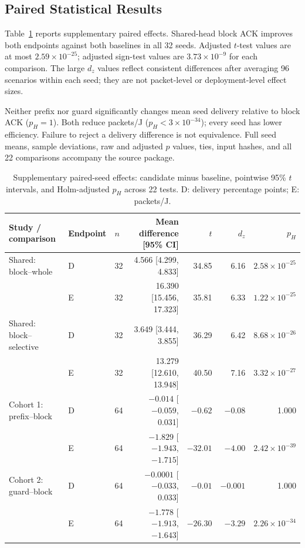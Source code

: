 \documentclass[journal,10pt]{IEEEtran}
\begin{document}
\subsection{Paired Statistical Results}
Table~\ref{tab:paired} reports supplementary paired effects. Shared-head block ACK improves both endpoints against both baselines in all 32 seeds. Adjusted $t$-test values are at most $2.59\times10^{-25}$; adjusted sign-test values are $3.73\times10^{-9}$ for each comparison. The large $d_z$ values reflect consistent differences after averaging 96 scenarios within each seed; they are not packet-level or deployment-level effect sizes.

Neither prefix nor guard significantly changes mean seed delivery relative to block ACK ($p_H=1$). Both reduce packets/J ($p_H<3\times10^{-34}$); every seed has lower efficiency. Failure to reject a delivery difference is not equivalence. Full seed means, sample deviations, raw and adjusted $p$ values, ties, input hashes, and all 22 comparisons accompany the source package.

\begin{table}[t]
\caption{Supplementary paired-seed effects: candidate minus baseline, pointwise 95\% $t$ intervals, and Holm-adjusted $p_H$ across 22 tests. D: delivery percentage points; E: packets/J.}
\label{tab:paired}\centering\small
\begin{tabular}{lllrrrr}\toprule
Study / comparison & Endpoint & $n$ & Mean difference [95\% CI] & $t$ & $d_z$ & $p_H$\\\midrule
Shared: block--whole & D & 32 & 4.566 [4.299, 4.833] & 34.85 & 6.16 & $2.58\times10^{-25}$\\
 & E & 32 & 16.390 [15.456, 17.323] & 35.81 & 6.33 & $1.22\times10^{-25}$\\
Shared: block--selective & D & 32 & 3.649 [3.444, 3.855] & 36.29 & 6.42 & $8.68\times10^{-26}$\\
 & E & 32 & 13.279 [12.610, 13.948] & 40.50 & 7.16 & $3.32\times10^{-27}$\\
Cohort 1: prefix--block & D & 64 & $-0.014$ [$-0.059$, 0.031] & $-0.62$ & $-0.08$ & 1.000\\
 & E & 64 & $-1.829$ [$-1.943$, $-1.715$] & $-32.01$ & $-4.00$ & $2.42\times10^{-39}$\\
Cohort 2: guard--block & D & 64 & $-0.0001$ [$-0.033$, 0.033] & $-0.01$ & $-0.001$ & 1.000\\
 & E & 64 & $-1.778$ [$-1.913$, $-1.643$] & $-26.30$ & $-3.29$ & $2.26\times10^{-34}$\\\bottomrule
\end{tabular}
\end{table}
\end{document}
